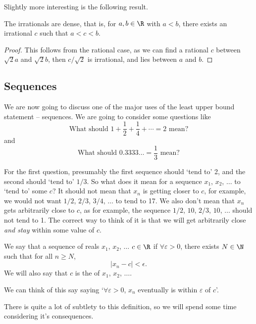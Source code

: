 Slightly more interesting is the following result.
\begin{theorem}
	The irrationals are dense, that is, for $a, b\in\R$ with $a<b$, there exists an irrational $c$ such that $a < c < b$.
\end{theorem}
\begin{proof}
	This follows from the rational case, as we can find a rational $c$ between $\sqrt{2}a$ and $\sqrt{2}b$, then $c/\sqrt{2}$ is irrational, and lies between $a$ and $b$.
\end{proof}

\subsection{Sequences}

We are now going to discuss one of the major uses of the least upper bound statement -- sequences. We are going to consider some questions like
$$
\text{What should } 1 + \frac{1}{2} + \frac{1}{4} + \cdots = 2 \text{ mean?}
$$
and 
$$
\text{What should } 0.3333\dots = \frac{1}{3} \text{ mean?}
$$

For the first question, presumably the first sequence should `tend to' 2, and the second should `tend to' $1/3$. So what does it mean for a sequence $x_1$, $x_2$, $\dots$ to `tend to' some $c$? It should not mean that $x_n$ is getting closer to $c$, for example, we would not want $1/2$, $2/3$, $3/4$, $\dots$ to tend to 17. We also don't mean that $x_n$ gets arbitrarily close to $c$, as for example, the sequence $1/2$, $10$, $2/3$, $10$, $\dots$ should not tend to 1.
The correct way to think of it is that we will get arbitrarily close \emph{and stay} within some value of $c$.

\begin{definition}
	We say that a sequence of reals $x_1$, $x_2$, $\dots$  $c \in \R$ if $\forall \varepsilon > 0$, there exists $N \in \N$ such that for all $n \geq N$, 
	$$
	|x_n - c| < \epsilon.
	$$
	We will also say that $c$ is the  of $x_1$, $x_2$, $\dots$.
\end{definition}

\begin{remark}[Informal]
	We can think of this say saying `$\forall \varepsilon > 0$, $x_n$ eventually is within $\varepsilon$ of $c$'.
\end{remark}

There is quite a lot of subtlety to this definition, so we will spend some time considering it's consequences.


